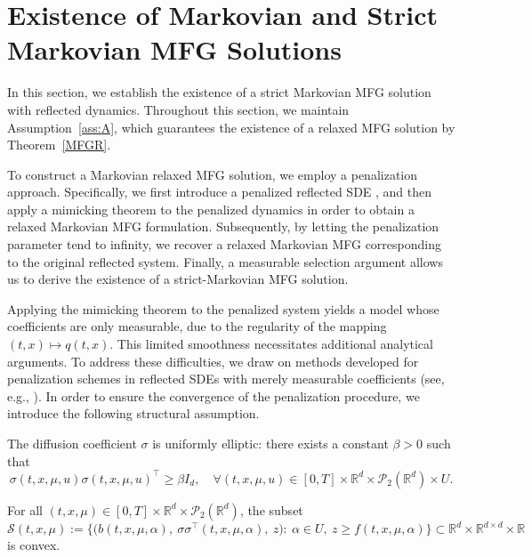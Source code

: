 \documentclass[11pt,amsfonts]{article}
\theoremstyle{plain}
\theoremstyle{assumpstyle}
\newenvironment{assumption}[1]
  {\renewcommand\theassumptionmanual{#1}\assumptionmanual[#1]}
  {\endassumptionmanual}
\numberwithin{equation}{section}
\numberwithin{theorem}{section}
\numberwithin{proposition}{section}
\numberwithin{definition}{section}
\numberwithin{remark}{section}
\numberwithin{corollary}{section}
\numberwithin{lemma}{section}
\begin{document}
\section{Existence of Markovian and Strict Markovian MFG Solutions}
\label{sec-mark}

In this section, we establish the existence of a strict Markovian MFG solution with reflected dynamics. Throughout this section, we maintain Assumption~\ref{ass:A}, which guarantees the existence of a relaxed MFG solution by Theorem~\ref{MFGR}.

To construct a Markovian relaxed MFG solution, we employ a penalization approach. Specifically, we first introduce a penalized reflected SDE , and then apply a mimicking theorem to the penalized dynamics in order to obtain a relaxed Markovian MFG formulation. Subsequently, by letting the penalization parameter tend to infinity, we recover a relaxed Markovian MFG corresponding to the original reflected system. Finally, a measurable selection argument allows us to derive the existence of a strict-Markovian MFG solution.

Applying the mimicking theorem to the penalized system yields a model whose coefficients are only measurable, due to the regularity of the mapping $(t,x) \mapsto q(t,x)$. This limited smoothness necessitates additional analytical arguments. To address these difficulties, we draw on methods developed for penalization schemes in reflected SDEs with merely measurable coefficients (see, e.g., \cite{mouchtabih,Slominski-measurable}). In order to ensure the convergence of the penalization procedure, we introduce the following structural assumption.

\begin{assumption}{\textbf{(M)}}
\label{ass:M}
The diffusion coefficient $\sigma$ is uniformly elliptic: there exists a constant $\beta > 0$ such that
\begin{equation*}
\sigma(t, x, \mu, u)\sigma(t, x, \mu, u)^{\top} \geq \beta I_d, 
\quad 
\forall (t, x, \mu, u) \in [0,T]\times\mathbb{R}^d\times\mathcal{P}_2(\mathbb{R}^d)\times U.
\end{equation*}
\end{assumption}
 
\begin{assumption}{\textbf{(C)}}
\label{ass:C}
For all $(t, x, \mu) \in [0,T] \times \mathbb{R}^d \times \mathcal{P}_2(\mathbb{R}^d)$, the subset
\begin{equation*}
\mathcal{S}(t,x,\mu)
:= 
\bigl\{
\bigl(b(t,x,\mu,\alpha),\ \sigma\sigma^{\top}(t,x,\mu,\alpha),\ z\bigr)
:\ \alpha \in U,\ z \ge f(t,x,\mu,\alpha)
\bigr\}
\subset \mathbb{R}^d \times \mathbb{R}^{d \times d} \times \mathbb{R}
\end{equation*}
is convex.
\end{assumption}
\end{document}

